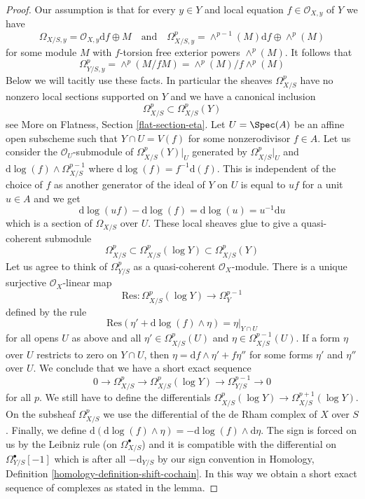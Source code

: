 \begin{proof}
Our assumption is that for every $y \in Y$ and local equation
$f \in \mathcal{O}_{X, y}$ of $Y$ we have
$$
\Omega_{X/S, y} = \mathcal{O}_{X, y}\text{d}f \oplus M
\quad\text{and}\quad
\Omega^p_{X/S, y} = \wedge^{p - 1}(M)\text{d}f \oplus \wedge^p(M)
$$
for some module $M$ with $f$-torsion free exterior powers $\wedge^p(M)$.
It follows that
$$
\Omega^p_{Y/S, y} = \wedge^p(M/fM) = \wedge^p(M)/f\wedge^p(M)
$$
Below we will tacitly use these facts.
In particular the sheaves $\Omega^p_{X/S}$ have no nonzero local
sections supported on $Y$ and we have a canonical inclusion
$$
\Omega^p_{X/S} \subset \Omega^p_{X/S}(Y)
$$
see More on Flatness, Section \ref{flat-section-eta}. Let $U = \Spec(A)$
be an affine open subscheme such that $Y \cap U = V(f)$ for some
nonzerodivisor $f \in A$. Let us consider the $\mathcal{O}_U$-submodule
of $\Omega^p_{X/S}(Y)|_U$ generated by
$\Omega^p_{X/S}|_U$ and $\text{d}\log(f) \wedge \Omega^{p - 1}_{X/S}$
where $\text{d}\log(f) = f^{-1}\text{d}(f)$.
This is independent of the choice of $f$ as another generator of the
ideal of $Y$ on $U$ is equal to $uf$ for a unit $u \in A$ and we get
$$
\text{d}\log(uf) - \text{d}\log(f) = \text{d}\log(u) = u^{-1}\text{d}u
$$
which is a section of $\Omega_{X/S}$ over $U$. These local
sheaves glue to give a quasi-coherent submodule
$$
\Omega^p_{X/S} \subset \Omega^p_{X/S}(\log Y) \subset \Omega^p_{X/S}(Y)
$$
Let us agree to think of $\Omega^p_{Y/S}$ as a quasi-coherent
$\mathcal{O}_X$-module. There is a unique surjective
$\mathcal{O}_X$-linear map
$$
\text{Res} : \Omega^p_{X/S}(\log Y) \to \Omega^{p - 1}_Y
$$
defined by the rule
$$
\text{Res}(\eta' + \text{d}\log(f) \wedge \eta) = \eta|_{Y \cap U}
$$
for all opens $U$ as above and all
$\eta' \in \Omega^p_{X/S}(U)$ and $\eta \in \Omega^{p - 1}_{X/S}(U)$.
If a form $\eta$ over $U$ restricts to zero on $Y \cap U$, then
$\eta = \text{d}f \wedge \eta' + f\eta''$ for some forms $\eta'$ and $\eta''$
over $U$. We conclude that
we have a short exact sequence
$$
0 \to \Omega^p_{X/S} \to \Omega^p_{X/S}(\log Y) \to \Omega^{p - 1}_{Y/S} \to 0
$$
for all $p$. We still have to define the differentials
$\Omega^p_{X/S}(\log Y) \to \Omega^{p + 1}_{X/S}(\log Y)$.
On the subsheaf $\Omega^p_{X/S}$ we use the differential of
the de Rham complex of $X$ over $S$. Finally, we define
$\text{d}(\text{d}\log(f) \wedge \eta) = -\text{d}\log(f) \wedge \text{d}\eta$.
The sign is forced on us by the Leibniz rule (on $\Omega^\bullet_{X/S}$)
and it is compatible with the differential on $\Omega^\bullet_{Y/S}[-1]$
which is after all $-\text{d}_{Y/S}$ by our sign convention in
Homology, Definition \ref{homology-definition-shift-cochain}.
In this way we obtain a short exact
sequence of complexes as stated in the lemma.
\end{proof}

